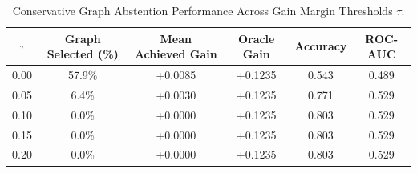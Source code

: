 \begin{table}[t]
\centering
\small
\caption{Conservative Graph Abstention Performance Across Gain Margin Thresholds $\tau$.}
\label{tab:conservative_abstention}
\begin{tabular}{cccccc}
\toprule
\textbf{$\tau$} & \textbf{Graph Selected (\%)} & \textbf{Mean Achieved Gain} & \textbf{Oracle Gain} & \textbf{Accuracy} & \textbf{ROC-AUC} \\
\midrule
0.00 &  57.9\% & +0.0085 & +0.1235 & 0.543 & 0.489 \\
0.05 &   6.4\% & +0.0030 & +0.1235 & 0.771 & 0.529 \\
0.10 &   0.0\% & +0.0000 & +0.1235 & 0.803 & 0.529 \\
0.15 &   0.0\% & +0.0000 & +0.1235 & 0.803 & 0.529 \\
0.20 &   0.0\% & +0.0000 & +0.1235 & 0.803 & 0.529 \\
\bottomrule
\end{tabular}
\end{table}